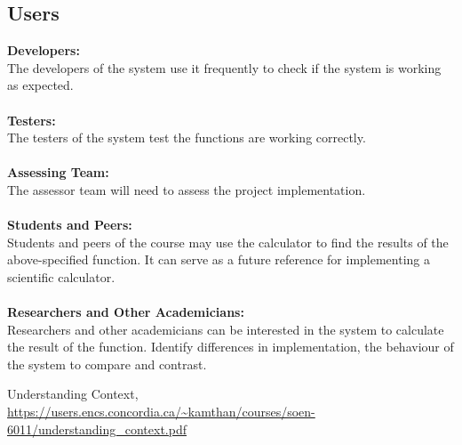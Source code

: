 \documentclass{article}
\begin{document}
\subsection{Users}
\textbf{Developers:}\\
The developers of the system use it frequently to check if the system is working as expected.\\\\
\textbf{Testers:}\\
The testers of the system test the functions are working correctly.\\\\
\textbf{Assessing Team:}\\
The assessor team will need to assess the project implementation.\\\\
\textbf{Students and Peers:}\\
Students and peers of the course may use the calculator to find the results of the above-specified function. It can serve as a future reference for implementing a scientific calculator.\\\\
\textbf{Researchers and Other Academicians:}\\
Researchers and other academicians can be interested in the system to calculate the result of the function. Identify differences in implementation, the behaviour of the system to compare and contrast.
\begin{thebibliography}{9}
Understanding Context,\\
\url{https://users.encs.concordia.ca/~kamthan/courses/soen-6011/understanding_context.pdf}
\end{thebibliography}
\end{document}

